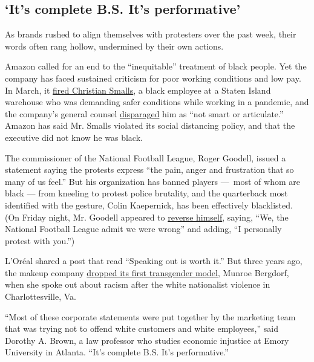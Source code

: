 \hypertarget{its-complete-bs-its-performative}{%
\subsection{`It's complete B.S. It's
performative'}\label{its-complete-bs-its-performative}}

As brands rushed to align themselves with protesters over the past week,
their words often rang hollow, undermined by their own actions.

Amazon called for an end to the ``inequitable'' treatment of black
people. Yet the company has faced sustained criticism for poor working
conditions and low pay. In March, it
\href{https://www.nytimes3xbfgragh.onion/2020/04/03/nyregion/coronavirus-nyc-chris-smalls-amazon.html}{fired
Christian Smalls}, a black employee at a Staten Island warehouse who was
demanding safer conditions while working in a pandemic, and the
company's general counsel
\href{https://www.nytimes3xbfgragh.onion/2020/04/18/technology/athena-mitchell-amazon.html}{disparaged}
him as ``not smart or articulate.'' Amazon has said Mr. Smalls violated
its social distancing policy, and that the executive did not know he was
black.

The commissioner of the National Football League, Roger Goodell, issued
a statement saying the protests express ``the pain, anger and
frustration that so many of us feel.'' But his organization has banned
players ---~most of whom are black --- from kneeling to protest police
brutality, and the quarterback most identified with the gesture, Colin
Kaepernick, has been effectively blacklisted. (On Friday night, Mr.
Goodell appeared to
\href{https://www.nytimes3xbfgragh.onion/2020/06/05/sports/football/trump-anthem-kneeling-kaepernick.html}{reverse
himself}, saying, ``We, the National Football League admit we were
wrong'' and adding, ``I personally protest with you.'')

L'Oréal shared a post that read ``Speaking out is worth it.'' But three
years ago, the makeup company
\href{https://www.nytimes3xbfgragh.onion/2017/09/02/business/munroe-bergdorf-loreal-transgender.html}{dropped
its first transgender model}, Munroe Bergdorf, when she spoke out about
racism after the white nationalist violence in Charlottesville, Va.

``Most of these corporate statements were put together by the marketing
team that was trying not to offend white customers and white
employees,'' said Dorothy A. Brown, a law professor who studies economic
injustice at Emory University in Atlanta. ``It's complete B.S. It's
performative.''

